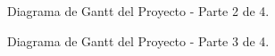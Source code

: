 \documentclass[
11pt, %
]{charter}
\begin{document}
\vspace{15px}

\begin{figure}[htpb]
\centering
{}
\caption{Diagrama de Gantt del Proyecto - Parte 2 de 4.}
\label{fig:diagBloques}
\end{figure}

\vspace{15px}

\begin{figure}[htpb]
\centering
{}
\caption{Diagrama de Gantt del Proyecto - Parte 3 de 4.}
\label{fig:diagBloques}
\end{figure}
\end{document}
